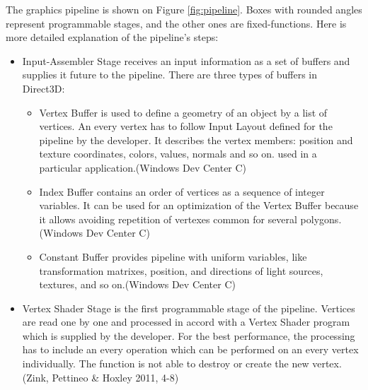 \documentclass[twoside, english, 11pt]{report}
\begin{document}
The graphics pipeline is shown on Figure \ref{fig:pipeline}. Boxes with rounded angles represent programmable stages, and the other ones are fixed-functions. Here is more detailed explanation of the pipeline's steps:

\begin{itemize}
\item Input-Assembler Stage receives an input information as a set of buffers and supplies it future to the pipeline. There are three types of buffers in Direct3D:
  \begin{itemize}
    \item Vertex Buffer is used to define a geometry of an object by a list of vertices. An every vertex has to follow Input Layout defined for the pipeline by the developer. It describes the vertex members: position and texture coordinates, colors, values, normals and so on. used in a particular application.(Windows Dev Center C)
    \item Index Buffer contains an order of vertices as a sequence of integer variables. It can be used for an optimization of the Vertex Buffer because it allows avoiding repetition of vertexes common for several polygons.(Windows Dev Center C)
    \item Constant Buffer provides pipeline with uniform variables, like transformation matrixes, position, and directions of light sources, textures, and so on.(Windows Dev Center C)
  \end{itemize}
  
\item Vertex Shader Stage is the first programmable stage of the pipeline. Vertices are read one by one and processed in accord with a Vertex Shader program which is supplied by the developer. For the best performance, the processing has to include an every operation which can be performed on an every vertex individually. The function is not able to destroy or create the new vertex.(Zink, Pettineo \& Hoxley 2011, 4-8)


\end{itemize}
\end{document}
